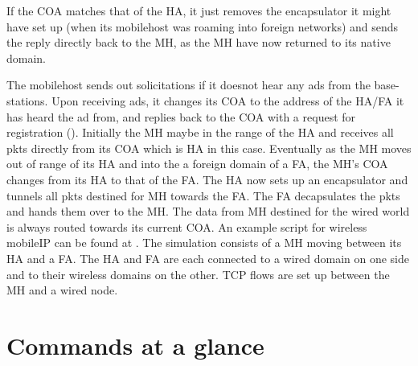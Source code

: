 {If the COA matches that of the HA, it just removes the encapsulator it
might have set up (when its mobilehost was roaming into foreign
networks) and sends the reply directly back to the MH, as the MH have
now returned to its native domain.

The mobilehost sends out solicitations if it doesnot hear any ads from the
base-stations. Upon receiving ads, it changes its COA to the address of
the HA/FA it has heard the ad from, and replies back to the COA with a
request for registration ().
Initially the MH maybe in the range of the HA and receives all pkts
directly from its COA which is HA in this case. 
Eventually as the MH moves out of range of its HA and into the a foreign
domain of a FA, the MH's COA changes from its HA to that of the FA. The HA
now sets up an encapsulator and tunnels all pkts destined for MH towards
the FA. The FA decapsulates the pkts and hands them over to the MH. The
data from MH destined for the wired world is always routed towards its
current COA.  
An example script for wireless mobileIP can be found at
. The simulation consists of a MH moving
between its HA and a FA. The HA and FA are each connected to a wired
domain on one side and to their wireless domains on the other. TCP flows
are set up between the MH and a wired node. 

\section{Commands at a glance}
\label{sec:wirelesscommand}

}
